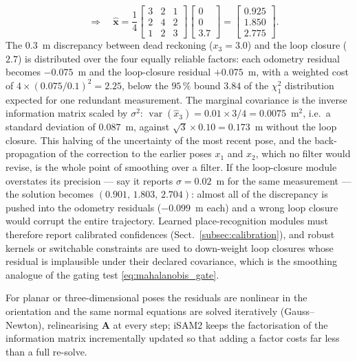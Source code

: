 \begin{example}
\begin{equation*}
\quad\Longrightarrow\quad
\widehat{\mathbf{x}}=\frac{1}{4}\begin{bmatrix}3&2&1\\2&4&2\\1&2&3\end{bmatrix}\begin{bmatrix}0\\0\\3.7\end{bmatrix}
=\begin{bmatrix}0.925\\1.850\\2.775\end{bmatrix}.
\end{equation*}
The $0.3$~m discrepancy between dead reckoning ($x_3=3.0$) and the loop closure ($2.7$) is distributed over the four equally reliable factors: each odometry residual becomes $-0.075$~m and the loop-closure residual $+0.075$~m, with a weighted cost of $4\times(0.075/0.1)^{2}=2.25$, below the $95\,\%$ bound $3.84$ of the $\chi^{2}_{1}$ distribution expected for one redundant measurement. The marginal covariance is the inverse information matrix scaled by $\sigma^{2}$: $\operatorname{var}(\widehat{x}_3)=0.01\times 3/4=0.0075$~m$^{2}$, i.e.\ a standard deviation of $0.087$~m, against $\sqrt{3}\times0.10=0.173$~m without the loop closure. This halving of the uncertainty of the most recent pose, and the back-propagation of the correction to the earlier poses $x_1$ and $x_2$, which no filter would revise, is the whole point of smoothing over a filter. If the loop-closure module overstates its precision --- say it reports $\sigma=0.02$~m for the same measurement --- the solution becomes $(0.901,\,1.803,\,2.704)$: almost all of the discrepancy is pushed into the odometry residuals ($-0.099$~m each) and a wrong loop closure would corrupt the entire trajectory. Learned place-recognition modules must therefore report calibrated confidences (Sect.~\ref{subsec:calibration}), and robust kernels or switchable constraints are used to down-weight loop closures whose residual is implausible under their declared covariance, which is the smoothing analogue of the gating test \eqref{eq:mahalanobis_gate}.
\end{example}
For planar or three-dimensional poses the residuals are nonlinear in the orientation and the same normal equations are solved iteratively (Gauss--Newton), relinearising $\mathbf{A}$ at every step; iSAM2 \cite{kaess2012_isam2} keeps the factorisation of the information matrix incrementally updated so that adding a factor costs far less than a full re-solve.

